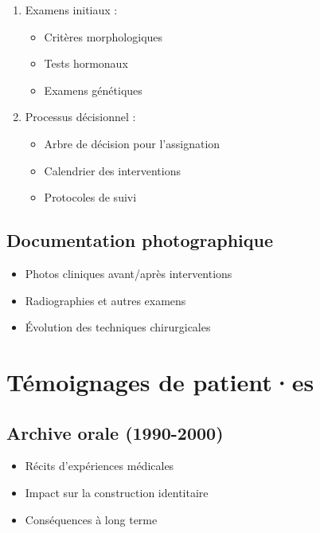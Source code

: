 \documentclass[
  letterpaper,
  DIV=11,
  numbers=noendperiod]{scrreprt}
\providecommand{\tightlist}{%
  \setlength{\itemsep}{0pt}\setlength{\parskip}{0pt}}\usepackage{longtable,booktabs,array}
\begin{document}
\begin{enumerate}
\def\labelenumi{\arabic{enumi}.}
\tightlist
\item
  Examens initiaux :

  \begin{itemize}
  \tightlist
  \item
    Critères morphologiques
  \item
    Tests hormonaux
  \item
    Examens génétiques
  \end{itemize}
\item
  Processus décisionnel :

  \begin{itemize}
  \tightlist
  \item
    Arbre de décision pour l'assignation
  \item
    Calendrier des interventions
  \item
    Protocoles de suivi
  \end{itemize}
\end{enumerate}

\subsection{Documentation
photographique}\label{documentation-photographique}

\begin{itemize}
\tightlist
\item
  Photos cliniques avant/après interventions
\item
  Radiographies et autres examens
\item
  Évolution des techniques chirurgicales
\end{itemize}

\section{Témoignages de patient·es}\label{tuxe9moignages-de-patientes}

\subsection{Archive orale (1990-2000)}\label{archive-orale-1990-2000}

\begin{itemize}
\tightlist
\item
  Récits d'expériences médicales
\item
  Impact sur la construction identitaire
\item
  Conséquences à long terme
\end{itemize}
\end{document}
